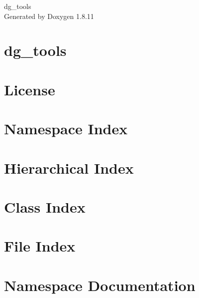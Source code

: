 \documentclass[twoside]{book}
\newcommand{\+}{\discretionary{\mbox{\scriptsize$\hookleftarrow$}}{}{}}
\newcommand{\clearemptydoublepage}{%
  \newpage{\pagestyle{empty}\cleardoublepage}%
}
\begin{document}
\hypersetup{pageanchor=false,
             bookmarksnumbered=true,
             pdfencoding=unicode
            }
\begin{titlepage}
\vspace*{7cm}
\begin{center}%
{\Large dg\+\_\+tools }\\
\vspace*{1cm}
{\large Generated by Doxygen 1.8.11}\\
\end{center}
\end{titlepage}
\clearemptydoublepage
\tableofcontents
\clearemptydoublepage
{}
\hypersetup{pageanchor=true}

\chapter{dg\+\_\+tools}
\label{md_readme}
\hypertarget{md_readme}{}

\chapter{License}
\label{license}
\hypertarget{license}{}

\chapter{Namespace Index}

\chapter{Hierarchical Index}

\chapter{Class Index}

\chapter{File Index}

\chapter{Namespace Documentation}

\end{document}
